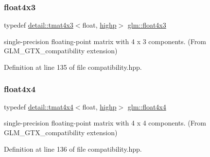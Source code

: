 \mbox{\label{group__gtx__compatibility_ga72398a5d715031923beca8907c52f5d6}} 
\subsubsection{\texorpdfstring{float4x3}{float4x3}}
{\footnotesize\ttfamily typedef \hyperlink{structglm_1_1detail_1_1tmat4x3}{detail\+::tmat4x3}$<$float, \hyperlink{namespaceglm_a0f04f086094c747d227af4425893f545ac6f7eab42eacbb10d59a58e95e362074}{highp}$>$ \hyperlink{group__gtx__compatibility_ga72398a5d715031923beca8907c52f5d6}{glm\+::float4x3}}



single-\/precision floating-\/point matrix with 4 x 3 components. (From G\+L\+M\+\_\+\+G\+T\+X\+\_\+compatibility extension) 



Definition at line 135 of file compatibility.\+hpp.

\mbox{\label{group__gtx__compatibility_ga1f48a19e35b3640cf3d509041f7a800b}} 
\subsubsection{\texorpdfstring{float4x4}{float4x4}}
{\footnotesize\ttfamily typedef \hyperlink{structglm_1_1detail_1_1tmat4x4}{detail\+::tmat4x4}$<$float, \hyperlink{namespaceglm_a0f04f086094c747d227af4425893f545ac6f7eab42eacbb10d59a58e95e362074}{highp}$>$ \hyperlink{group__gtx__compatibility_ga1f48a19e35b3640cf3d509041f7a800b}{glm\+::float4x4}}



single-\/precision floating-\/point matrix with 4 x 4 components. (From G\+L\+M\+\_\+\+G\+T\+X\+\_\+compatibility extension) 



Definition at line 136 of file compatibility.\+hpp.

\mbox{\label{group__gtx__compatibility_gaba41d7803e4b24c17656d74377b88286}} 
